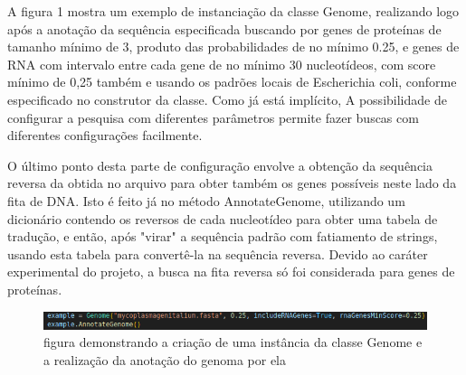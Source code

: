 \documentclass[brazilian,12pt,a4paper,final]{article}
\begin{document}
	
		A figura 1 mostra um exemplo de instanciação da classe Genome, realizando logo após a anotação da sequência especificada buscando por genes de proteínas 
		de tamanho mínimo de 3, produto das probabilidades de no mínimo 0.25, e genes de RNA com intervalo entre cada gene de no mínimo 30 nucleotídeos, com 
		score mínimo de 0,25 também e usando os padrões locais de Escherichia coli, conforme especificado no construtor da classe. Como já está implícito,
		A possibilidade de configurar a pesquisa com diferentes parâmetros permite fazer buscas com diferentes configurações facilmente.
		
		\vspace{0.5cm}
		
		O último ponto desta parte de configuração envolve a obtenção da sequência reversa da obtida no arquivo para obter também os genes possíveis
		 neste lado da fita de DNA. Isto é feito já no método AnnotateGenome, utilizando um dicionário contendo os reversos de cada nucleotídeo para obter uma
		 tabela de tradução, e então, após "virar" a sequência padrão com fatiamento de strings, usando esta tabela para convertê-la na sequência reversa. Devido ao caráter experimental do projeto, a busca na fita
		 reversa só foi considerada para genes de proteínas.
		 
		
	\begin{figure}[hbtp]
		\begin{center}
			\includegraphics[]{../Figures/Instanciacao.png}
			\caption{figura demonstrando a criação de uma instância da classe Genome e a realização da anotação do genoma por ela}
			\label{fig}
		\end{center}
	\end{figure}
\end{document}
